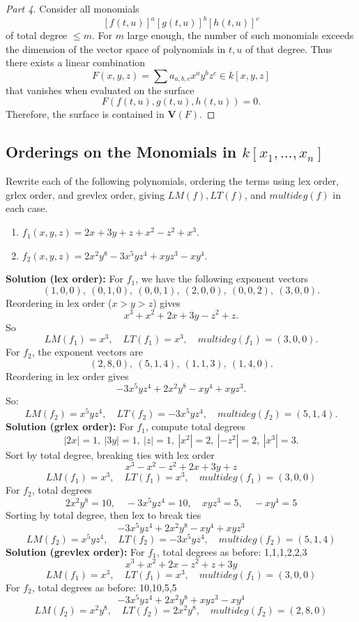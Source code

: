\begin{proof}[Part 4]
    Consider all monomials
    \[
    [f(t,u)]^a [g(t,u)]^b [h(t,u)]^c
    \]
    of total degree $\le m$.
    For $m$ large enough,
    the number of such monomials exceeds the dimension of the vector space of polynomials in $t,u$ of that degree. 
    Thus there exists a linear combination
    \[
    F(x,y,z) = \sum a_{a,b,c} x^a y^b z^c \in k[x,y,z]
    \]
    that vanishes when evaluated on the surface
    \[
    F(f(t,u), g(t,u), h(t,u)) = 0.
    \]
    Therefore, the surface is contained in $\textbf{V}(F)$.
\end{proof}

\subsection{Orderings on the Monomials in $k[x_1, \ldots, x_n]$}


\begin{tcolorbox}[title=Problem 1, breakable]
    Rewrite each of the following polynomials,
    ordering the terms using lex order,
    grlex order, and grevlex order,
    giving $LM(f), LT(f)$, and $multideg(f)$
    in each case.
    \begin{enumerate}
        \item $f_1(x, y, z) = 2x + 3y + z + x^2 - z^2 + x^3$.
        \item $f_2(x, y, z) = 2x^2 y^8 - 3x^5 y z^4 + x y z^3 - x y^4$.
    \end{enumerate}
\end{tcolorbox}

\textbf{Solution (lex order): }
For $f_1$, we have the following exponent vectors 
\[(1, 0, 0),\ (0, 1, 0),\ (0, 0, 1),\ (2, 0, 0),\ (0, 0, 2),\ (3, 0, 0).\]
Reordering in lex order ($x > y > z$) gives 
\[
x^3 + x^2 + 2x + 3y - z^2 + z.
\]
So
\[
LM(f_1) = x^3, \quad LT(f_1) = x^3, \quad multideg(f_1) = (3,0,0).
\]
For $f_2$, the exponent vectors are
\[(2, 8, 0),\ (5, 1, 4),\ (1, 1, 3),\ (1, 4, 0).\]
Reordering in lex order gives
\[
-3x^5 y z^4 + 2x^2 y^8 - x y^4 + x y z^3.
\]
So:
\[
LM(f_2) = x^5 y z^4, \quad LT(f_2) = -3x^5 y z^4, \quad multideg(f_2) = (5,1,4).
\]
\textbf{Solution (grlex order): }
For $f_1$, compute total degrees
\[
|2x| = 1,\ |3y| = 1,\ |z| = 1,\ |x^2| = 2,\ |-z^2| = 2,\ |x^3| = 3.
\]
Sort by total degree, breaking ties with lex order
\[
x^3 - x^2 - z^2 + 2x + 3y + z
\]
\[
LM(f_1) = x^3, \quad LT(f_1) = x^3, \quad multideg(f_1) = (3,0,0)
\]
For $f_2$, total degrees
\[
2x^2 y^8 = 10, \quad -3x^5 y z^4 = 10, \quad x y z^3 = 5, \quad -x y^4 = 5
\]
Sorting by total degree, then lex to break ties
\[
-3x^5 y z^4 + 2x^2 y^8 - x y^4 + x y z^3
\]
\[
LM(f_2) = x^5 y z^4, \quad LT(f_2) = -3x^5 y z^4, \quad multideg(f_2) = (5,1,4)
\]
\textbf{Solution (grevlex order): }
For $f_1$, total degrees as before: 1,1,1,2,2,3  
\[
x^3 + x^2 + 2x - z^2 + z + 3y
\]
\[
LM(f_1) = x^3, \quad LT(f_1) = x^3, \quad multideg(f_1) = (3,0,0)
\]
For $f_2$, total degrees as before: 10,10,5,5  
\[
 - 3x^5 y z^4 + 2x^2 y^8 + x y z^3 - x y^4
\]
\[
LM(f_2) = x^2 y^8, \quad LT(f_2) = 2x^2 y^8, \quad multideg(f_2) = (2,8,0)
\]


